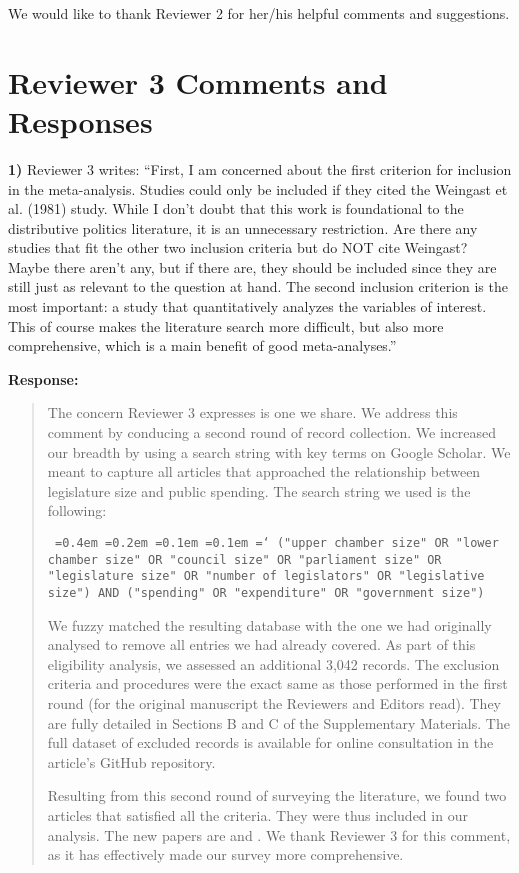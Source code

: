 \documentclass[a4paper,12pt]{article}
\newcommand*\justify{%
  \fontdimen2\font=0.4em%
  \fontdimen3\font=0.2em%
  \fontdimen4\font=0.1em%
  \fontdimen7\font=0.1em%
  \hyphenchar\font=`\-%
}
\begin{document}
We would like to thank Reviewer 2 for her/his helpful comments and suggestions.

\section*{Reviewer 3 Comments and Responses}

\noindent \textbf{1)} Reviewer 3 writes: ``First, I am concerned about the first criterion for inclusion in the meta-analysis. Studies could only be included if they cited the Weingast et al. (1981) study. While I don't doubt that this work is foundational to the distributive politics literature, it is an unnecessary restriction. Are there any studies that fit the other two inclusion criteria but do NOT cite Weingast? Maybe there aren't any, but if there are, they should be included since they are still just as relevant to the question at hand. The second inclusion criterion is the most important: a study that quantitatively analyzes the variables of interest. This of course makes the literature search more difficult, but also more comprehensive, which is a main benefit of good meta-analyses.''

\vspace{.3cm}

\noindent \textbf{Response:} 
\begin{quote}
    The concern Reviewer 3 expresses is one we share. We address this comment by conducing a second round of record collection. We increased our breadth by using a search string with key terms on Google Scholar. We meant to capture all articles that approached the relationship between legislature size and public spending. The search string we used is the following:
    
    \texttt{\justify ("upper chamber size" OR "lower chamber size" OR "council size" OR "parliament size" OR "legislature size" OR "number of legislators" OR "legislative size") AND ("spending" OR "expenditure" OR "government size")}
    
    We fuzzy matched the resulting database with the one we had originally analysed to remove all entries we had already covered. As part of this eligibility analysis, we assessed an additional 3,042 records. The exclusion criteria and procedures were the exact same as those performed in the first round (for the original manuscript the Reviewers and Editors read). They are fully detailed in Sections B and C of the Supplementary Materials. The full dataset of excluded records is available for online consultation in the article's GitHub repository.
    
    Resulting from this second round of surveying the literature, we found two articles that satisfied all the criteria. They were thus included in our analysis. The new papers are \citet{coate2011government} and \citet{debenedetto2018effect}. We thank Reviewer 3 for this comment, as it has effectively made our survey more comprehensive. 
\end{quote}
\end{document}
